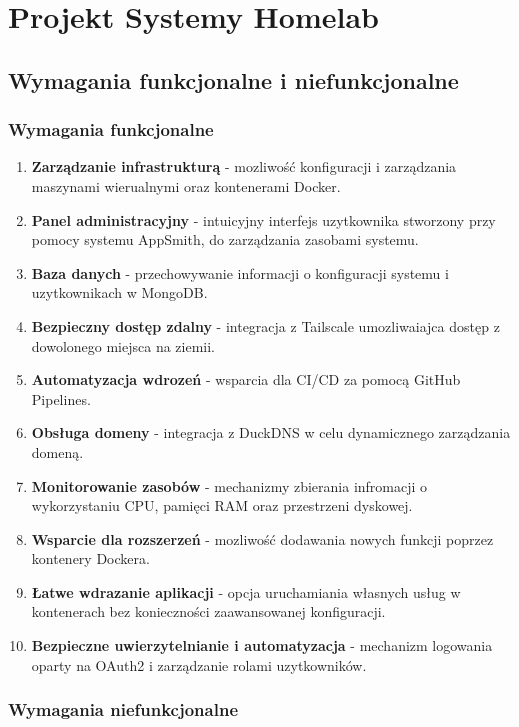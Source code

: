 \chapter{Projekt Systemy Homelab}

\section{Wymagania funkcjonalne i niefunkcjonalne}

\subsection{Wymagania funkcjonalne}

\begin{enumerate}
    \item \textbf{Zarządzanie infrastrukturą} - mozliwość konfiguracji i zarządzania maszynami wierualnymi oraz kontenerami Docker.
    \item \textbf{Panel administracyjny} - intuicyjny interfejs uzytkownika stworzony przy pomocy systemu AppSmith, do zarządzania zasobami systemu.
    \item \textbf{Baza danych} - przechowywanie informacji o konfiguracji systemu i uzytkownikach w MongoDB.
    \item \textbf{Bezpieczny dostęp zdalny} - integracja z Tailscale umozliwaiajca dostęp z dowolonego miejsca na ziemii.
    \item \textbf{Automatyzacja wdrozeń} - wsparcia dla CI/CD za pomocą GitHub Pipelines.
    \item \textbf{Obsługa domeny} - integracja z DuckDNS w celu dynamicznego zarządzania domeną.
    \item \textbf{Monitorowanie zasobów} - mechanizmy zbierania infromacji o wykorzystaniu CPU, pamięci RAM oraz przestrzeni dyskowej.
    \item \textbf{Wsparcie dla rozszerzeń} - mozliwość dodawania nowych funkcji poprzez kontenery Dockera.
    \item \textbf{Łatwe wdrazanie aplikacji} - opcja uruchamiania własnych usług w kontenerach bez konieczności zaawansowanej konfiguracji.
    \item \textbf{Bezpieczne uwierzytelnianie i automatyzacja} - mechanizm logowania oparty na OAuth2 i zarządzanie rolami uzytkowników.
\end{enumerate}

\subsection{Wymagania niefunkcjonalne}

